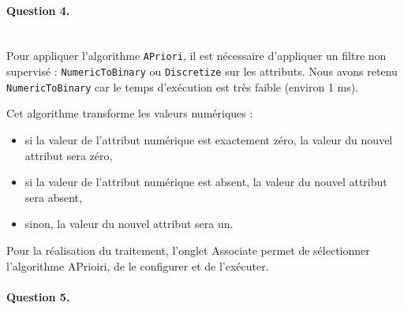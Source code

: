\documentclass[a4paper,11pt]{article}
\begin{document}
\newpage
\paragraph{Question 4.} ~\\

    Pour appliquer l'algorithme \texttt{APriori}, il est nécessaire d'appliquer un filtre non supervisé : \texttt{NumericToBinary} ou \texttt{Discretize} sur les attributs. Nous avons retenu \texttt{NumericToBinary} car le temps d'exécution est très faible (environ 1 ms).
    
    Cet algorithme transforme les valeurs numériques : 
    \begin{itemize}
	\item si la valeur de l'attribut numérique est exactement zéro, la valeur du nouvel attribut sera zéro,
	\item si la valeur de l'attribut numérique est absent, la valeur du nouvel attribut sera absent,
	\item sinon, la valeur du nouvel attribut sera un.\\
	\end{itemize}
	
    Pour la réalisation du traitement, l'onglet \og{}Associate\fg{} permet de sélectionner  l'algorithme APrioiri, de le configurer et de l'exécuter.
    
    

\paragraph{Question 5.} ~\\
	
	
	


				
		
\end{document}
